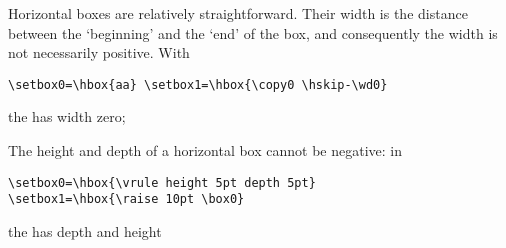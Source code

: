 \documentclass{book}
\begin{document}
Horizontal boxes are relatively straightforward. Their width is the
distance between the `beginning' and the `end' of the
box,
and consequently the width is not necessarily positive.
With
\begin{verbatim}
\setbox0=\hbox{aa} \setbox1=\hbox{\copy0 \hskip-\wd0}
\end{verbatim}
the  has width zero;
The height and depth of a horizontal box cannot be negative: in
\begin{verbatim}
\setbox0=\hbox{\vrule height 5pt depth 5pt}
\setbox1=\hbox{\raise 10pt \box0}
\end{verbatim}
the  has depth \n{0pt} and height~\n{15pt}
\end{document}
